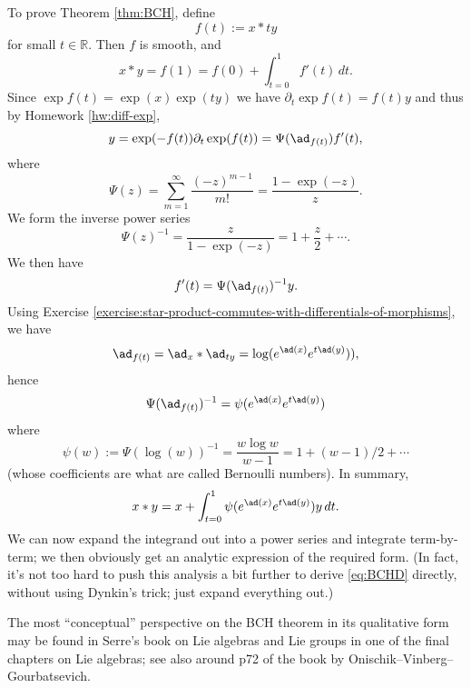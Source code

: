 \documentclass[reqno]{amsart} 
\begin{document}
To prove Theorem \ref{thm:BCH}, define
\begin{equation*}
  f(t) := x \ast t y
\end{equation*}
for small $t \in \mathbb{R}$.  Then $f$ is smooth, and
\begin{equation*}
  x \ast y = f(1) = f(0) + \int_{t=0}^1 f'(t) \, d t.
\end{equation*}
Since $\exp f(t) = \exp(x) \exp(t y)$ we have $\partial_t \exp f(t) = f(t) y$ and thus by Homework \ref{hw:diff-exp},
\begin{equation*}
  y = \exp(-f(t)) \partial_t \exp(f(t)) = \Psi(\ad_{f(t)}) f'(t),
\end{equation*}
where
\begin{equation*}
  \Psi(z) = \sum_{m=1}^{\infty} \frac{(-z)^{m-1}}{m!}  = \frac{1 - \exp(-z)}{z}.
\end{equation*}
We form the inverse power series
\begin{equation*}
  \Psi(z)^{-1} = \frac{z}{1 - \exp(-z)} = 1 + \frac{z}{2} + \dotsb.
\end{equation*}
We then have
\begin{equation*}
  f'(t) = \Psi(\ad_{f(t)})^{-1} y.
\end{equation*}
Using Exercise \ref{exercise:star-product-commutes-with-differentials-of-morphisms}, we have
\begin{equation*}
  \ad_{f(t)} = \ad_{x} \ast \ad_{t y} = \log(e^{\ad(x)} e^{t \ad(y)})),
\end{equation*}
hence
\begin{equation*}
  \Psi(\ad_{f(t)})^{-1} = \psi(e^{\ad(x)} e^{t \ad(y)})
\end{equation*}
where
\begin{equation*}
  \psi(w) := \Psi(\log(w))^{-1} = \frac{w \log w}{w - 1} = 1 + (w-1)/2 + \dotsb
\end{equation*}
(whose coefficients are what are called Bernoulli numbers).  In summary,
\begin{equation*}
  x \ast y = x + \int_{t=0}^1 \psi(e^{\ad(x)} e^{t \ad(y)}) y \, d t.
\end{equation*}
We can now expand the integrand out into a power series and integrate term-by-term; we then obviously get an analytic expression of the required form.  (In fact, it's not too hard to push this analysis a bit further to derive \eqref{eq:BCHD} directly, without using Dynkin's trick; just expand everything out.)
\begin{remark}
  The most ``conceptual'' perspective on the BCH theorem in its qualitative form may be found in Serre's book on Lie algebras and Lie groups in one of the final chapters on Lie algebras; see also around p72 of the book by Onischik--Vinberg--Gourbatsevich.
\end{remark}
\end{document}
